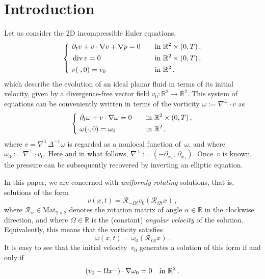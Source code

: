 \documentclass[11pt,oneside]{amsart}
\theoremstyle{definition}
\newcommand{\Om}{\Omega}
\def\RR{\mathbb{R}}
\newcommand{\cR}{{\mathcal R}}
\newcommand{\pd}{\partial}
\DeclareMathOperator\Div{div} \DeclareMathOperator\Ric{Ric}
\numberwithin{equation}{section}
\begin{document}
\section{Introduction}
Let us consider the 2D incompressible Euler equations,
\begin{equation}\label{E.Euler} 
\left\{
    \begin{aligned}
        \ &\pd_t v  + v\cdot \nabla v+\nabla p=0 \quad && \textup{in } \RR^2 \times (0,T)\,, \\
        & \Div v = 0 && \textup{in } \RR^2 \times (0,T)\,,\\
        &  v(\cdot,0 ) = v_0 && \textup{in } \RR^2\,,
    \end{aligned}
    \right.
\end{equation}
which describe the evolution of an ideal planar fluid in terms of its initial velocity, given by a divergence-free vector field $v_0:\RR^2\to\RR^2$. This system of equations can be conveniently written in terms of the vorticity $\omega:= \nabla^\perp\cdot v$ as
\begin{equation*}%
\left\{
    \begin{aligned}
        \ &\pd_t \omega  + v\cdot \nabla \omega=0 \quad && \textup{in } \RR^2 \times (0,T)\,, \\
        &  \omega(\cdot,0 ) = \omega_0 && \textup{in } \RR^2\,,
    \end{aligned}
    \right.
\end{equation*}
where $v=\nabla^\perp \Delta^{-1}\omega$ is regarded as a nonlocal function of~$\omega$, and where $\omega_0:=\nabla^\perp\cdot v_0$. Here and in what follows, $\nabla^{\perp} := (-\pd_{x_2},\, \pd_{x_1})$. Once~$v$ is known, the pressure can be subsequently recovered by inverting an elliptic equation.

In this paper, we are concerned with {\em uniformly rotating}\/ solutions, that is, solutions of the form
\begin{equation}\label{E.rotating} 
v(x,t)= \cR_{-\Omega t} v_0(\cR_{\Omega t} x)\,,
\end{equation}
where $\cR_{\alpha}\in \mathrm{Mat}_{2\times 2}$ denotes the rotation matrix of angle $\alpha\in\RR$ in the clockwise direction, and where $\Om \in \RR$ is the (constant) {\em angular velocity}\/ of the solution. Equivalently, this means that the vorticity satisfies
$$ \omega(x,t) = \omega_0(\cR_{ \Omega t} x)\,.$$
It is easy to see that the initial velocity~$v_0$ generates a solution of this form if and only if
\begin{equation}\label{E.Euler1} 
(v_0 -  \Omega x^\perp) \cdot \nabla \omega_0 =0  \quad \textup{in } \RR^2 \,.
\end{equation}
\end{document}
